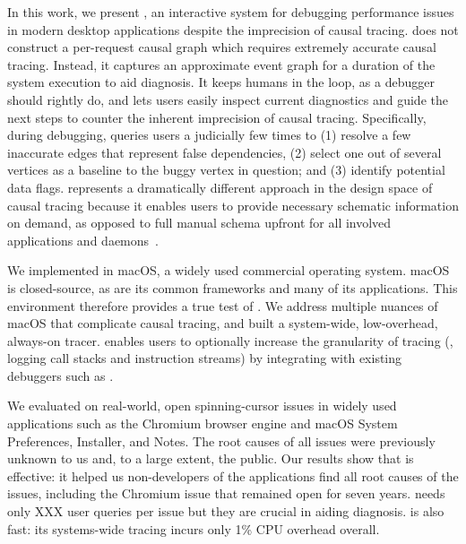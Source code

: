 In this work, we present \xxx, an interactive system for debugging
performance issues in modern desktop applications despite the imprecision
of causal tracing. \xxx does not construct a per-request causal graph
which requires extremely accurate causal tracing.  Instead, it captures an
approximate event graph for a duration of the system execution to aid
diagnosis.  It keeps humans in the loop, as a debugger should rightly do,
and lets users easily inspect current diagnostics and guide the next steps
to counter the inherent imprecision of causal tracing.  Specifically,
during debugging, \xxx queries users a judicially few times to (1) resolve
a few inaccurate edges that represent false dependencies, (2) select one
out of several vertices as a baseline to the buggy vertex in question; and
(3) identify potential data flags.  \xxx represents a dramatically
different approach in the design space of causal tracing because it
enables users to provide necessary schematic information on demand, as
opposed to full manual schema upfront for all involved applications and
daemons~\cite{barham2004using}.

We implemented \xxx in macOS, a widely used commercial operating
system. macOS is closed-source, as are its common frameworks and many of
its applications.  This environment therefore provides a true test of
\xxx.  We address multiple nuances of macOS that complicate causal
tracing, and built a system-wide, low-overhead, always-on tracer.  \xxx
enables users to optionally increase the granularity of tracing (\eg,
logging call stacks and instruction streams) by integrating with existing
debuggers such as .

We evaluated \xxx on \nbug real-world, open spinning-cursor issues in
widely used applications such as the Chromium browser engine and macOS
System Preferences, Installer, and Notes.  The root causes of all \nbug
issues were previously unknown to us and, to a large extent, the
public. Our results show that \xxx is effective: it helped us
non-developers of the applications find all root causes of the issues,
including the Chromium issue that remained open for seven years.  \xxx
needs only XXX user queries per issue but they are crucial in aiding
diagnosis. \xxx is also fast: its systems-wide tracing incurs only 1\% CPU
overhead overall.


